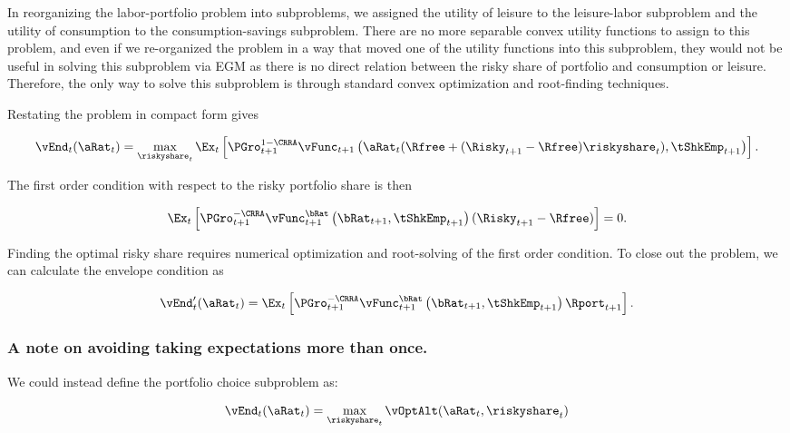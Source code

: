 \documentclass[\econtexRoot/SequentialEGM]{subfiles}
\begin{document}
In reorganizing the labor-portfolio problem into subproblems, we assigned the utility of leisure to the leisure-labor subproblem and the utility of consumption to the consumption-savings subproblem. There are no more separable convex utility functions to assign to this problem, and even if we re-organized the problem in a way that moved one of the utility functions into this subproblem, they would not be useful in solving this subproblem via EGM as there is no direct relation between the risky share of portfolio and consumption or leisure. Therefore, the only way to solve this subproblem is through standard convex optimization and root-finding techniques.

Restating the problem in compact form gives

\begin{equation}
    \vEnd_{t}(\aRat_{t}) = \max_{\riskyshare_{t}}  \Ex_{t} \left[ \PGro_{t+1}^{1-\CRRA}
    \vFunc_{t+1}\left(\aRat_{t}(\Rfree + (\Risky_{t+1} - \Rfree) \riskyshare_{t}), \tShkEmp_{t+1}\right)
    \right].
\end{equation}

The first order condition with respect to the risky portfolio share is then

\begin{equation}
    \Ex_{t} \left[ \PGro_{t+1}^{-\CRRA} \vFunc_{t+1}^{\bRat}\left(\bRat_{t+1}, \tShkEmp_{t+1}\right) (\Risky_{t+1} - \Rfree)  \right] = 0.
\end{equation}

Finding the optimal risky share requires numerical optimization and root-solving of the first order condition. To close out the problem, we can calculate the envelope condition as

\begin{equation}
    \vEnd_{t}'(\aRat_{t}) =  \Ex_{t} \left[ \PGro_{t+1}^{-\CRRA} \vFunc_{t+1}^{\bRat}\left(\bRat_{t+1}, \tShkEmp_{t+1}\right) \Rport_{t+1}  \right].
\end{equation}

\subsubsection{A note on avoiding taking expectations more than once.}

We could instead define the portfolio choice subproblem as:

\begin{equation}
    \vEnd_{t}(\aRat_{t}) = \max_{\riskyshare_{t}} \vOptAlt(\aRat_{t}, \riskyshare_{t})
\end{equation}
\end{document}
